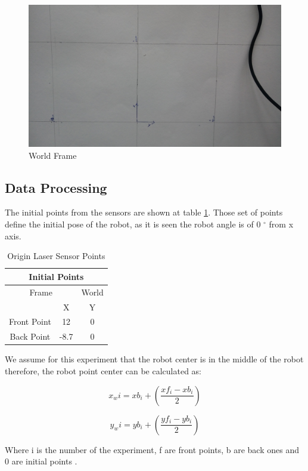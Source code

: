 \documentclass[10pt]{scrartcl}
\begin{document}
\begin{figure}[h!]
\centering
\includegraphics[trim=200 0 500 550,clip, scale=0.10]{images/settings4}
\caption{World Frame}
\label{fig:9}
\end{figure}

\subsection*{Data Processing}

The initial points from the sensors are shown at table \ref{tab:2}. Those set of points define the initial pose of the robot, as it is seen the robot angle is of  0 $^{\circ} $ from x axis.

\begin{table}[h!]
\caption{Origin Laser Sensor Points}
\label{tab:2}
\centering
\begin{tabular}{|c|c|c|}
\hline
\multicolumn{3}{|c|}{Initial Points}\\
\hline
\multicolumn{2}{|c|}{Frame}&World 	\\
\hline
&X&Y\\
\hline
Front Point&	12	&0\\
\hline
Back Point&	-8.7&0\\
\hline
\end{tabular}
\end{table}

We assume for this experiment that the robot center is in the middle of the robot therefore, the robot point center can be calculated as:

	\[
	x_wi = xb_i + \left(\frac{xf_i - xb_i}{2}\right)
	\]
	
	\[
	y_wi = yb_i + \left(\frac{yf_i - yb_i}{2}\right)
	\]

\small Where i is the number of the experiment, f are front points, b are back ones and 0 are initial points .\\
\end{document}
